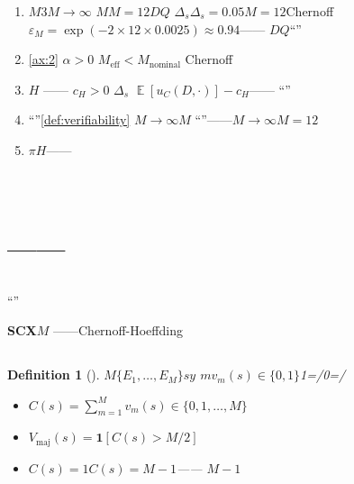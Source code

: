 \documentclass[11pt,a4paper]{article}
\newtheorem{definition}[theorem]{Definition}
\theoremstyle{remark}
\DeclareMathOperator{\E}{\mathbb{E}}
\begin{document}
\begin{enumerate}[label=(\arabic*)]
    \item \textbf{$M$}3$M \to \infty$
          $M$$M=12$$D$$Q$
          $\Delta_s$$\Delta_s = 0.05$$M=12$Chernoff
          $\varepsilon_M = \exp(-2 \times 12 \times 0.0025) \approx 0.94$——
          \textbf{
          $D$$Q$}``''

    \item \textbf{}\ref{ax:2}
          $\alpha > 0$
          $M_{\text{eff}} < M_{\text{nominal}}$
          Chernoff

    \item \textbf{}$H$
          ——
          $c_H > 0$
          $\Delta_s$
          $\E[u_C(D, \cdot)] - c_H$——
          ``''

    \item \textbf{}``''\ref{def:verifiability}
          $M \to \infty$$M$
          ``''——$M \to \infty$$M=12$
          

    \item \textbf{}
          $\pi$$H$——
          
          
\end{enumerate}

\section{\\
         \large ——}

\subsection{}

``''\textit{}
\textit{}\textbf{
}


\textbf{SCX$M$}
——Chernoff-Hoeffding

\subsection{}

\begin{definition}[]
\label{def:cross_verification}
$M$$\{E_1, \ldots, E_M\}$$s$$y$
$m$$v_m(s) \in \{0,1\}$1=/0=/

\begin{itemize}
    \item \textbf{}$C(s) = \sum_{m=1}^{M} v_m(s) \in \{0, 1, \ldots, M\}$
    \item \textbf{}$V_{\text{maj}}(s) = \mathbf{1}[C(s) > M/2]$
    \item \textbf{}$C(s) = 1$$C(s) = M-1$——
          $M-1$
\end{itemize}
\end{definition}
\end{document}
